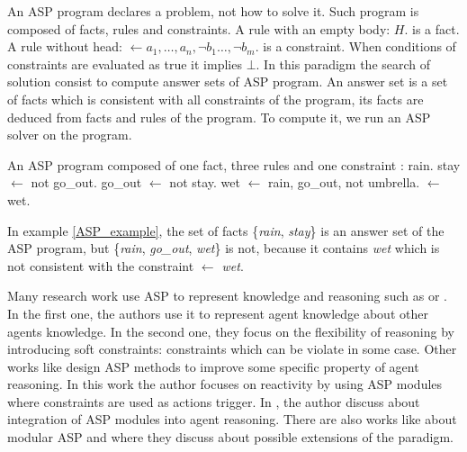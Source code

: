 \documentclass{aamas2012}
\begin{document}
	An ASP program declares a problem, not how to solve it.
	Such program is composed of facts, rules and constraints. 
	A rule with an empty body: $H.$ is a fact.
	A rule without head: $\leftarrow a_{1}, \ldots , a_{n}, \neg b_{1} \ldots, \neg b_{m}.$ is a constraint.
	When conditions of constraints are evaluated as true it implies $\bot$.
	In this paradigm the search of solution consist to compute answer sets of ASP program.
	An answer set is a set of facts which is consistent with all constraints of the program, its facts are deduced from facts and rules of the program.
	To compute it, we run an ASP solver on the program.
	
	\begin{example}
		\label{ASP_example}
		An ASP program composed of one fact, three rules and one constraint :\newline
		\newline
		rain.\newline
		stay $\leftarrow$ not go\_out.\newline
		go\_out $\leftarrow$ not stay.\newline
		wet $\leftarrow$ rain, go\_out, not umbrella.\newline
		$\leftarrow$ wet.
	\end{example}
	
	In example \ref{ASP_example}, the set of facts \{\emph{rain}, \emph{stay}\} is an answer set of the ASP program, but \{\emph{rain}, \emph{go\_out}, \emph{wet}\} is not, 
	because it contains \emph{wet} which is not consistent with the constraint \emph{$\leftarrow$ wet}.
	
	Many research work use ASP to represent knowledge and reasoning such as \cite{DBLP:conf/atal/BaralGSP10} or \cite{DBLP:conf/clima/NieuwenborghVHV06}.
	In the first one, the authors use it to represent agent knowledge about other agents knowledge.
	In the second one, they focus on the flexibility of reasoning by introducing soft constraints: constraints which can be violate in some case.
	Other works like \cite{DBLP:conf/datalog/Costantini10} design ASP methods to improve some specific property of agent reasoning.
	In this work the author focuses on reactivity by using ASP modules where constraints are used as actions trigger.
	In \cite{DBLP:conf/lpnmr/Costantini09}, the author discuss about integration of ASP modules into agent reasoning.
	There are also works like \cite{DBLP:conf/aaaiss/BaralAD06} about modular ASP and 
	\cite{DBLP:conf/birthday/FaberW11} where they discuss about possible extensions of the paradigm.
\end{document}
